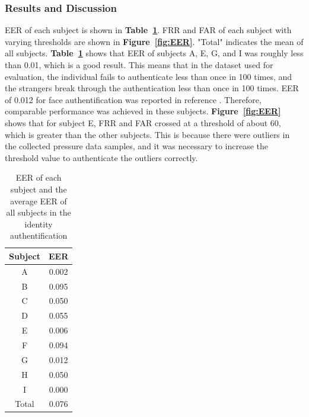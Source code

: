 \documentclass[sigchi,authordraft]{acmart}
\newcommand\figref[1]{\textbf{Figure~\ref{fig:#1}}}
\newcommand\tabref[1]{\textbf{Table~\ref{tab:#1}}}
\begin{document}
\subsubsection{Results and Discussion}
EER of each subject is shown in \tabref{EER_num}. FRR and FAR of each subject with varying thresholds are shown in \figref{EER}. "Total" indicates the mean of all subjects. \tabref{EER_num} shows that EER of subjects A, E, G, and I was roughly less than 0.01, which is a good result. This means that in the dataset used for evaluation, the individual fails to authenticate less than once in 100 times, and the strangers break through the authentication less than once in 100 times. EER of 0.012 for face authentification was reported in reference \cite{face_auth}. Therefore, comparable performance was achieved in these subjects. \figref{EER} shows that for subject E, FRR and FAR crossed at a threshold of about 60, which is greater than the other subjects. This is because there were outliers in the collected pressure data samples, and it was necessary to increase the threshold value to authenticate the outliers correctly.\par


\begin{table}[!t]
  \centering
  \caption{EER of each subject and the average EER of all subjects in the identity authentification}
  \begin{tabular}{c|c} \hline\hline
    Subject & EER \\ \hline
    A & 0.002 \\
    B & 0.095 \\
    C & 0.050 \\
    D & 0.055 \\
    E & 0.006 \\
    F & 0.094 \\
    G & 0.012 \\
    H & 0.050 \\
    I & 0.000 \\ \hline
    Total & 0.076 \\ \hline
  \end{tabular}
  \label{tab:EER_num}
\end{table}
\end{document}
